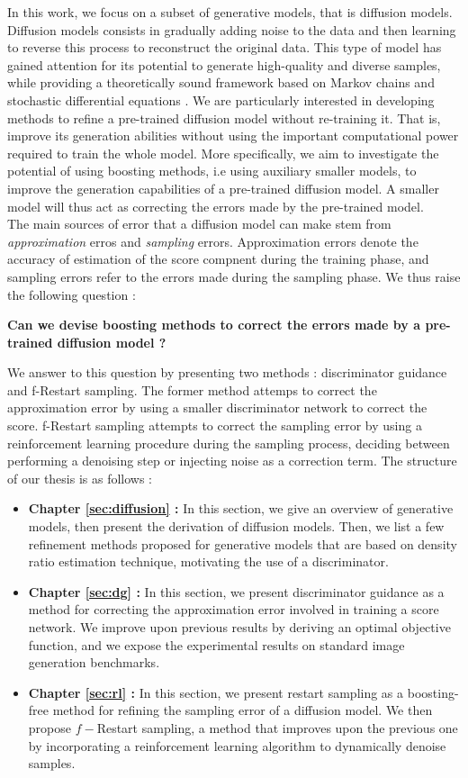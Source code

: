 In this work, we focus on a subset of generative models, that is diffusion models. Diffusion models consists in 
gradually adding noise to the data and then learning to reverse this process to reconstruct the original data. This type of model has gained attention for its potential to generate high-quality and diverse samples, while providing a theoretically sound framework based on Markov chains \citep{ho2020denoisingdiffusionprobabilisticmodels} and stochastic differential equations \citep{song2021scorebasedgenerativemodelingstochastic}. 
We are particularly interested in developing methods to refine a pre-trained diffusion model without re-training it. That is, improve its generation abilities without using the important computational power required to train the whole model.
More specifically, we aim to investigate the potential of using boosting methods, i.e using auxiliary smaller models, to improve the generation capabilities of a pre-trained diffusion model. A smaller model will thus act as correcting the errors made by the pre-trained model. 
\\
The main sources of error that a diffusion model can make stem from \textit{approximation} erros and \textit{sampling} errors. Approximation errors denote the accuracy of estimation of the score compnent during the training phase, and sampling errors refer to the errors made during the sampling phase. 
We thus raise the following question : 
\begin{center}
    \textbf{Can we devise boosting methods to correct the errors made by a pre-trained diffusion model ?}
\end{center}
We answer to this question by presenting two methods : discriminator guidance and f-Restart sampling. The former method attemps to correct the approximation error by using a smaller discriminator network to correct the score. f-Restart sampling attempts to correct the sampling error by using a reinforcement learning procedure during the sampling process, deciding between performing a denoising step or injecting noise as a correction term.
The structure of our thesis is as follows : \begin{itemize}
    \item \textbf{Chapter \ref{sec:diffusion} :} In this section, we give an overview of generative models, then present the derivation of diffusion models. Then, we list a few refinement methods proposed for generative models that are based on density ratio estimation technique, motivating the use of a discriminator.
    \item \textbf{Chapter \ref{sec:dg} :} In this section, we present discriminator guidance as a method for correcting the approximation error involved in training a score network. We improve upon previous results by deriving an optimal objective function, and we expose the experimental results on standard image generation benchmarks.
    \item \textbf{Chapter \ref{sec:rl} :} In this section, we present restart sampling as a boosting-free method for refining the sampling error of a diffusion model. We then propose $f-$Restart sampling, a method that improves upon the previous one by incorporating a reinforcement learning algorithm to dynamically denoise samples.
\end{itemize}
